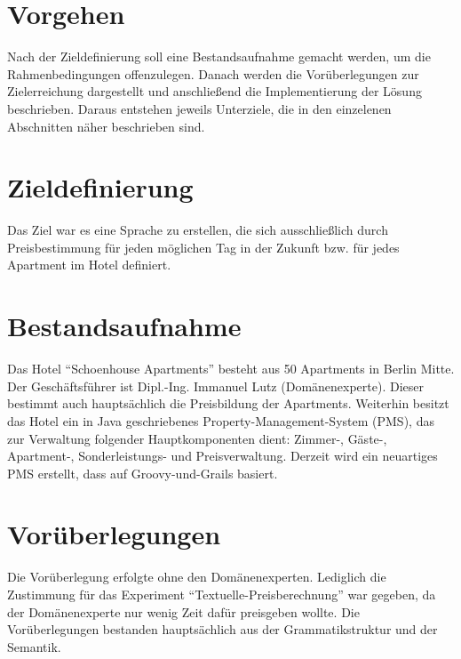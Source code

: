 \documentclass[11pt,english,ngerman, headsepline]{scrreprt}
\begin{document}
\section{Vorgehen}
Nach der Zieldefinierung soll eine Bestandsaufnahme gemacht werden, um die
Rahmenbedingungen offenzulegen. Danach werden die
Vorüberlegungen zur Zielerreichung dargestellt und anschließend die
Implementierung der Lösung beschrieben. Daraus entstehen jeweils Unterziele, die
in den einzelenen Abschnitten näher beschrieben sind. 

\section{Zieldefinierung}
Das Ziel war es eine Sprache zu erstellen, die sich ausschließlich durch
Preisbestimmung für jeden möglichen Tag in der Zukunft bzw. für jedes Apartment
im Hotel definiert.

\section{Bestandsaufnahme}
 Das Hotel
``Schoenhouse Apartments'' besteht aus 50 Apartments in Berlin Mitte. Der
Geschäftsführer ist Dipl.-Ing. Immanuel Lutz (Domänenexperte). Dieser bestimmt
auch hauptsächlich die Preisbildung der Apartments. Weiterhin besitzt das Hotel ein in Java
geschriebenes Property-Management-System (PMS), das zur Verwaltung folgender
Hauptkomponenten dient: Zimmer-, Gäste-, Apartment-, Sonderleistungs- und
Preisverwaltung.
Derzeit wird ein neuartiges PMS erstellt, dass auf Groovy-und-Grails basiert.
 
 \section{Vorüberlegungen}

Die Vorüberlegung erfolgte ohne den Domänenexperten. Lediglich die Zustimmung
für das Experiment ``Textuelle-Preisberechnung'' war gegeben, da der
Domänenexperte nur wenig Zeit dafür preisgeben wollte. Die Vorüberlegungen
bestanden hauptsächlich aus der Grammatikstruktur und der Semantik. 
\end{document}
